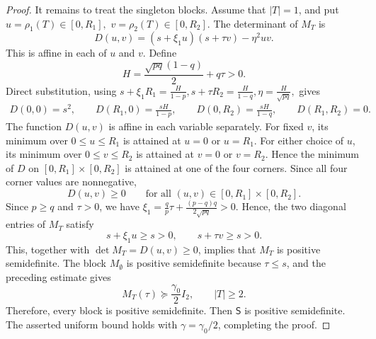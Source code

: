 \documentclass[11pt]{article}
\numberwithin{equation}{section}
\theoremstyle{definition}
\theoremstyle{remark}
\begin{document}
\begin{proof}
It remains to treat the singleton blocks.  Assume that $|T|=1$, and put
$
 u=\rho_1(T)\in[0,R_1],
$
$
 v=\rho_2(T)\in[0,R_2].
$
The determinant of $M_T$ is
$$
 D(u,v)
 =
 (s+\xi_1u)(s+\tau v)-\eta^2uv.
$$
This is affine in each of $u$ and $v$.  Define
$$
 H=\frac{\sqrt{pq}(1-q)}2+q\tau>0.
$$
Direct substitution, using
$
 s+\xi_1R_1=\frac{H}{1-p},
 s+\tau R_2=\frac{H}{1-q},
 \eta=\frac{H}{\sqrt{pq}},
$
gives
$$
\begin{aligned}
 D(0,0)=s^2,\qquad
 D(R_1,0)=\frac{sH}{1-p},\qquad
 D(0,R_2)=\frac{sH}{1-q},\qquad
 D(R_1,R_2)=0.
\end{aligned}
$$
The function $D(u,v)$ is affine in each variable separately.
For fixed $v$, its minimum over $0\leq u\leq R_1$ is attained at
$u=0$ or $u=R_1$. For either choice of $u$, its minimum over
$0\leq v\leq R_2$ is attained at $v=0$ or $v=R_2$. Hence the minimum
of $D$ on $[0,R_1]\times[0,R_2]$ is attained at one of the four
corners. Since all four corner values are nonnegative,
$$
 D(u,v)\geq0
 \qquad
 \text{for all }(u,v)\in[0,R_1]\times[0,R_2].
$$
Since $p\geq q$ and $\tau>0$, we have
$
 \xi_1
 =
 \frac qp\tau+\frac{(p-q)q}{2\sqrt{pq}}
 >0.
$
Hence, the two diagonal entries of $M_T$ satisfy
$$
 s+\xi_1u\geq s>0,
 \qquad
 s+\tau v\geq s>0.
$$
This, together with $\det M_T=D(u,v)\geq0$,  implies that 
$M_T$ is positive semidefinite.
 The block
$M_{\emptyset}$ is positive semidefinite because $\tau\leq s$, and
the preceding estimate gives
$$
 M_T(\tau)\succeq\frac{\gamma_0}{2}I_2,\qquad
 |T|\geq2.
$$
Therefore, every block is positive semidefinite. Then $\mathsf S$ is
positive semidefinite. The asserted uniform bound holds with
$\gamma=\gamma_0/2$, completing the proof.
\end{proof}
\end{document}
